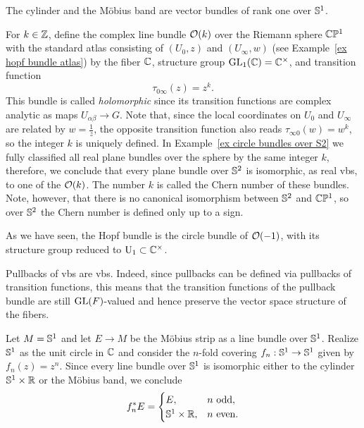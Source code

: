 \begin{example}
The cylinder and the M\"obius band are vector bundles of rank one over $\mathbb{S}^1$.
\end{example}

\begin{example}\label{ex holomorphic bundle O(k)}
    For $k\in\mathbb{Z}$, define the complex line bundle $\mathcal{O}(k)$ over the Riemann sphere $\mathbb{C}\mathbb{P}^1$ with the standard atlas consisting of $(U_0,z)$ and $(U_\infty,w)$ (see Example~\ref{ex hopf bundle atlas}) by the fiber $\mathbb{C}$, structure group $\operatorname{GL}_1(\mathbb{C})=\mathbb{C}^\times$, and transition function
    \[\tau_{0\infty}(z)=z^k.\]
    This bundle is called \emph{holomorphic} since its transition functions are complex analytic as maps $U_{\alpha\beta}\to G$.
    Note that, since the local coordinates on $U_0$ and $U_\infty$ are related by $w=\frac{1}{z}$, the opposite transition function also reads $\tau_{\infty 0}(w)=w^k$, so the integer $k$ is uniquely defined. In Example~\ref{ex circle bundles over S2} we fully classified all real plane bundles over the sphere by the same integer $k$, therefore, we conclude that every plane bundle over $\mathbb{S}^2$ is isomorphic, as real \glspl{vb}, to one of the $\mathcal{O}(k)$. The number $k$ is called the Chern number of these bundles. Note, however, that there is no canonical isomorphism between $\mathbb{S}^2$ and $\mathbb{C}\mathbb{P}^1$, so over $\mathbb{S}^2$ the Chern number is defined only up to a sign.
    
    As we have seen, the Hopf bundle is the circle bundle of $\mathcal{O}(-1)$, with its structure group reduced to $\operatorname{U}_1\subset \mathbb{C}^\times$.
\end{example}


\begin{rem}
    Pullbacks of \glspl{vb} are \glspl{vb}. Indeed, since pullbacks can be defined via pullbacks of transition functions, this means that the transition functions of the pullback bundle are still $\operatorname{GL}(F)$-valued and hence preserve the vector space structure of the fibers.
\end{rem}


\begin{example}
    Let $M=\mathbb{S}^1$ and let $E\to M$ be the M\"obius strip as a line bundle over $\mathbb{S}^1$. Realize $\mathbb{S}^1$ as the unit circle in $\mathbb{C}$ and consider the $n$-fold covering $f_n:\mathbb{S}^1\to \mathbb{S}^1$ given by $f_n(z)=z^n$. Since every line bundle over $\mathbb{S}^1$ is isomorphic either to the cylinder $\mathbb{S}^1\times \mathbb{R}$ or the M\"obius band, we conclude
    \[f_n^\ast E=\begin{cases}
        E,& n\text{ odd},\\
        \mathbb{S}^1\times\mathbb{R},& n\text{ even}.
    \end{cases}\]
\end{example}



